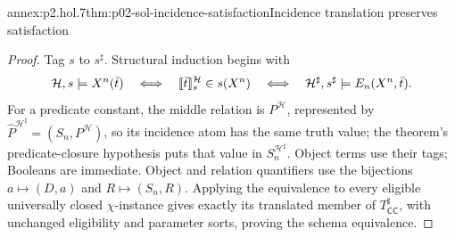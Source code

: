 \begin{annexitem}{annex:p2.hol.7}{thm:p02-sol-incidence-satisfaction}{Incidence translation preserves satisfaction}
\begin{proof}
Tag \(s\) to \(s^\sharp\).  Structural induction begins with
\[
 \mathcal H,s\models X^n(\bar t)
 \quad\Longleftrightarrow\quad
 \lbrack\!\lbrack\bar t\rbrack\!\rbrack_s^{\mathcal H}\in s(X^n)
 \quad\Longleftrightarrow\quad
 \mathcal H^\sharp,s^\sharp\models E_n(X^n,\bar t).
\]
For a predicate constant, the middle relation is
\(P^{\mathcal H}\), represented by
\(\widehat P^{\mathcal H^\sharp}=(S_n,P^{\mathcal H})\), so its incidence
atom has the same truth value; the theorem's predicate-closure hypothesis puts
that value in \(S_n^{\mathcal H^\sharp}\).  Object terms use their tags; Booleans are
immediate.  Object and relation quantifiers use the bijections
\(a\mapsto(D,a)\) and \(R\mapsto(S_n,R)\).  Applying the equivalence to every
eligible universally closed \(\chi\)-instance gives exactly its translated
member of \(T_{\mathsf{CC}}^\sharp\), with unchanged eligibility and parameter
sorts, proving the schema equivalence.
\end{proof}
\end{annexitem}

